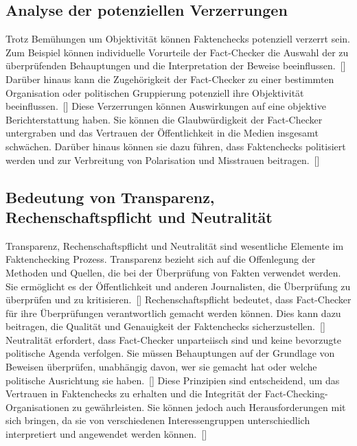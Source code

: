 \documentclass[a4paper,listof=totoc,bibliography=totoc]{scrartcl}
\begin{document}
\subsection{Analyse der potenziellen Verzerrungen}

Trotz Bemühungen um Objektivität können Faktenchecks potenziell verzerrt sein. 
Zum Beispiel können individuelle Vorurteile der Fact-Checker die Auswahl der zu überprüfenden Behauptungen und die 
Interpretation der Beweise beeinflussen.~[\cite{nyhan2010}] Darüber hinaus kann die Zugehörigkeit 
der Fact-Checker zu einer bestimmten Organisation oder politischen Gruppierung potenziell ihre 
Objektivität beeinflussen.~[\cite{graves2016}]
\newline
\newline
Diese Verzerrungen können Auswirkungen auf eine objektive Berichterstattung haben. 
Sie können die Glaubwürdigkeit der Fact-Checker untergraben und das Vertrauen der Öffentlichkeit 
in die Medien insgesamt schwächen. Darüber hinaus können sie dazu führen, dass Faktenchecks 
politisiert werden und zur Verbreitung von Polarisation und Misstrauen beitragen.~[\cite{amazeen2018}]

\subsection{Bedeutung von Transparenz, Rechenschaftspflicht und Neutralität}

Transparenz, Rechenschaftspflicht und Neutralität sind wesentliche Elemente im 
Faktenchecking Prozess. 
Transparenz bezieht sich auf die Offenlegung der Methoden und Quellen, die bei der Überprüfung von 
Fakten verwendet werden. Sie ermöglicht es der Öffentlichkeit und anderen Journalisten, die Überprüfung 
zu überprüfen und zu kritisieren.~[\cite{graves2018}] 
\newline
\newline
Rechenschaftspflicht bedeutet, dass Fact-Checker für ihre Überprüfungen verantwortlich gemacht werden können. 
Dies kann dazu beitragen, die Qualität und Genauigkeit der Faktenchecks sicherzustellen.~[\cite{amazeen2018}]
\newline
\newline
Neutralität erfordert, dass Fact-Checker unparteiisch sind und keine bevorzugte politische Agenda verfolgen. 
Sie müssen Behauptungen auf der Grundlage von Beweisen überprüfen, unabhängig davon, wer sie gemacht hat oder 
welche politische Ausrichtung sie haben.~[\cite{graves2016}]
\newline
\newline
Diese Prinzipien sind entscheidend, um das Vertrauen in Faktenchecks zu erhalten und die Integrität der 
Fact-Checking-Organisationen zu gewährleisten. Sie können jedoch auch Herausforderungen mit sich bringen, 
da sie von verschiedenen Interessengruppen unterschiedlich interpretiert und angewendet werden können.~[\cite{nyhan2010}]
\end{document}
